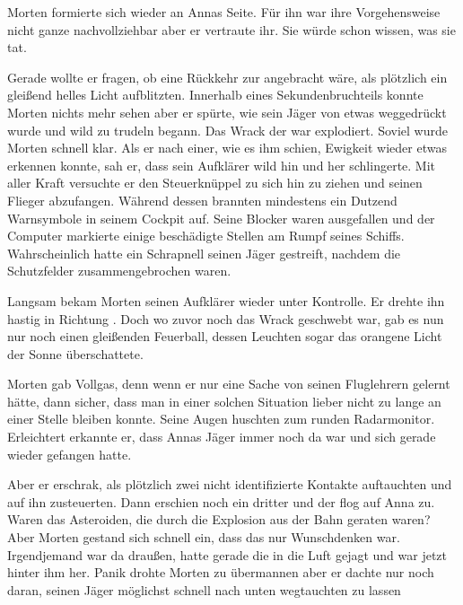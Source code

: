 \par

Morten formierte sich wieder an Annas Seite. Für ihn war ihre Vorgehensweise nicht ganze nachvollziehbar aber er vertraute ihr. Sie würde schon wissen, was sie tat.

\par

Gerade wollte er fragen, ob eine Rückkehr zur  angebracht wäre, als plötzlich ein gleißend helles Licht aufblitzten. Innerhalb eines Sekundenbruchteils konnte Morten nichts mehr sehen aber er spürte, wie sein Jäger von etwas weggedrückt wurde und wild zu trudeln begann.
\ortswechsel
Das Wrack der  war explodiert. Soviel wurde Morten schnell klar. Als er nach einer, wie es ihm schien, Ewigkeit wieder etwas erkennen konnte, sah er, dass sein Aufklärer wild hin und her schlingerte. Mit aller Kraft versuchte er den Steuerknüppel zu sich hin zu ziehen und seinen Flieger abzufangen. Während dessen brannten mindestens ein Dutzend Warnsymbole in seinem Cockpit auf. Seine Blocker waren ausgefallen und der Computer markierte einige beschädigte Stellen am Rumpf seines Schiffs. Wahrscheinlich hatte ein Schrapnell seinen Jäger gestreift, nachdem die Schutzfelder zusammengebrochen waren.

\par

Langsam bekam Morten seinen Aufklärer wieder unter Kontrolle. Er drehte ihn hastig in Richtung . Doch wo zuvor noch das Wrack geschwebt war, gab es nun nur noch einen gleißenden Feuerball, dessen Leuchten sogar das orangene Licht der Sonne überschattete.

\par

Morten gab Vollgas, denn wenn er nur eine Sache von seinen Fluglehrern gelernt hätte, dann sicher, dass man in einer solchen Situation lieber nicht zu lange an einer Stelle bleiben konnte. Seine Augen huschten zum runden Radarmonitor. Erleichtert erkannte er, dass Annas Jäger immer noch da war und sich gerade wieder gefangen hatte.

\par

Aber er erschrak, als plötzlich zwei nicht identifizierte Kontakte auftauchten und auf ihn zusteuerten. Dann erschien noch ein dritter und der flog auf Anna zu. Waren das Asteroiden, die durch die Explosion aus der Bahn geraten waren? Aber Morten gestand sich schnell ein, dass das nur Wunschdenken war. Irgendjemand war da draußen, hatte gerade die  in die Luft gejagt und war jetzt hinter ihm her. Panik drohte Morten zu übermannen aber er dachte nur noch daran, seinen Jäger möglichst schnell nach unten wegtauchten zu lassen

